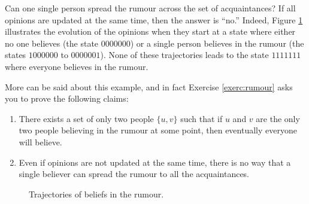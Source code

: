 \documentclass[a4paper, 11pt]{book}
\numberwithin{equation}{section}
\theoremstyle{plain}
\renewcommand{\(}{\ldbrack}
\renewcommand{\)}{\rdbrack}
\begin{document}
Can one single person spread the rumour across the set of acquaintances? If all opinions are updated at the same time, then the answer is ``no.'' Indeed, Figure \ref{fig:rumour_trajectories} illustrates the evolution of the opinions when they start at a state where either no one believes (the state $0000000$) or a single person believes in the rumour (the states $1000000$ to $0000001$). None of these trajectories leads to the state $1111111$ where everyone believes in the rumour.

More can be said about this example, and in fact Exercise \ref{exerc:rumour} asks you to prove the following claims:
\begin{enumerate}
	\item There exists a set of only two people $\{u,v\}$ such that if $u$ and $v$ are the only two people believing in the rumour at some point, then eventually everyone will believe.
	
	\item Even if opinions are not updated at the same time, there is no way that a single believer can spread the rumour to all the acquaintances.
\end{enumerate}


\begin{figure}
\centering
{}
\caption{Trajectories of beliefs in the rumour.} \label{fig:rumour_trajectories}
\end{figure}
\end{document}
